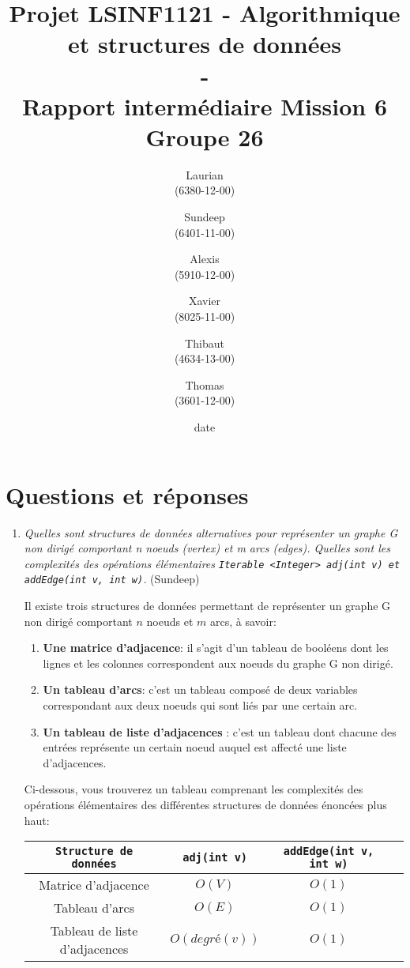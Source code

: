\documentclass[11pt]{article}
\title{\textbf{Projet LSINF1121 -  Algorithmique et structures de données\\ - \\ Rapport intermédiaire Mission 6} \\ {\large Groupe 26}}
\author{Laurian \bsc{Detiffe} \\(6380-12-00)\and Sundeep \bsc{Dhillon} \\(6401-11-00)\and Alexis \bsc{Macq} \\ (5910-12-00) \and Xavier \bsc{Pérignon} \\ (8025-11-00)\and Thibaut \bsc{Piquard}\\(4634-13-00)\and Thomas \bsc{Wyckmans} \\ (3601-12-00)}
\date{date}
\date{\vspace*{25mm}
\texttt{[image: logo.jpg]}\\
		\vspace*{30mm}
		\begin{center}
		Année académique 2015-2016 \\	
		\end{center}}
\begin{document}
\thispagestyle{empty}

\maketitle
\thispagestyle{empty}

\section*{Questions et réponses}
\begin{enumerate}

\item \textit{Quelles sont structures de données alternatives pour représenter un graphe G
non dirigé comportant n noeuds (vertex) et m arcs (edges). Quelles sont les
complexités des opérations élémentaires \texttt{Iterable <Integer> adj(int
v) et addEdge(int v, int w)}.} (Sundeep) \medskip

Il existe trois structures de données permettant de représenter un graphe G non dirigé comportant $n$ noeuds et $m$ arcs, à savoir:
\begin{enumerate}
\item \textbf{Une matrice d'adjacence}: il s'agit d'un tableau de booléens dont les lignes et les colonnes correspondent aux noeuds du graphe G non dirigé.
\item \textbf{Un tableau d'arcs}: c'est un tableau composé de deux variables correspondant aux deux noeuds qui sont liés par une certain arc.
\item \textbf{Un tableau de liste d'adjacences} : c'est un tableau dont chacune des entrées représente un certain noeud auquel est affecté une liste d'adjacences.
\end{enumerate}
Ci-dessous, vous trouverez un tableau comprenant les complexités des opérations élémentaires des différentes structures de données énoncées plus haut:
\begin{table}[h!]
\begin{center}
\begin{tabular}{ |c|c|c|c| } 
\hline
 \texttt{Structure de données} & \texttt{adj(int v)} & \texttt{addEdge(int v, int w)} \\
  
  \hline Matrice d'adjacence & $O(V)$ & $O(1)$ \\ 
  \hline Tableau d'arcs & $O(E)$ & $O(1)$ \\ 
  \hline Tableau de liste d'adjacences & $O(degré(v))$ & $O(1)$\\
  \hline
\end{tabular}
\end{center}
\end{table}



\end{enumerate}
\end{document}
